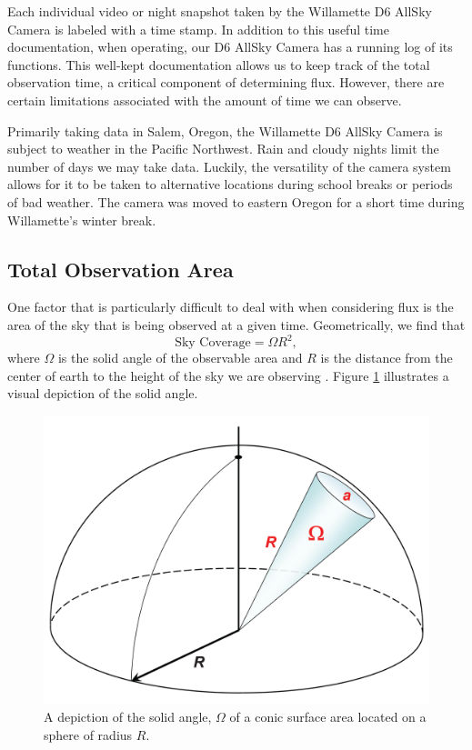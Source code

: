 Each individual video or night snapshot taken by the Willamette D6 AllSky Camera is labeled with a time stamp.  
In addition to this useful time documentation, when operating, our D6 AllSky Camera has a running log of its functions.
This well-kept documentation allows us to keep track of the total observation time, a critical component of determining flux.  
However, there are certain limitations associated with the amount of time we can observe.

Primarily taking data in Salem, Oregon, the Willamette D6 AllSky Camera is subject to weather in the Pacific Northwest.  
Rain and cloudy nights limit the number of days we may take data.
Luckily, the versatility of the camera system allows for it to be taken to alternative locations during school breaks or periods of bad weather.
The camera was moved to eastern Oregon for a short time during Willamette's winter break.


\subsection{Total Observation Area}

One factor that is particularly difficult to deal with when considering flux is the area of the sky that is being observed at a given time.
Geometrically, we find that
\begin{equation}
    \text{Sky Coverage} = \Omega R^2,
    \label{area_eq}
\end{equation}
where $\Omega$ is the solid angle of the observable area and $R$ is the distance from the center of earth to the height of the sky we are observing \cite{russell_photometry_2018}.
Figure \ref{solid_ang} illustrates a visual depiction of the solid angle.  

\begin{figure}[ht!]
  \centering
  \includegraphics[scale=0.07]{images/solidangle.png}
  \caption{A depiction of the solid angle, $\Omega$ of a conic surface area located on a sphere of radius $R$.}
  \label{solid_ang}
\end{figure}

